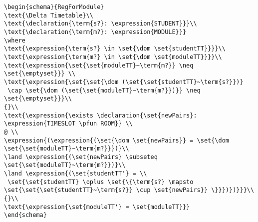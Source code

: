 \begin{verbatim}
\begin{schema}{RegForModule}
\text{\Delta Timetable}\\
\text{\declaration{\term{s?}: \expression{STUDENT}}}\\
\text{\declaration{\term{m?}: \expression{MODULE}}}
\where
\text{\expression{\term{s?} \in \set{\dom \set{studentTT}}}}\\
\text{\expression{\term{m?} \in \set{\dom \set{moduleTT}}}}\\
\text{\expression{\set{\set{moduleTT}~\term{m?}} \neq \set{\emptyset}}} \\
\text{\expression{\set{\set{\dom (\set{\set{studentTT}~\term{s?}})}
 \cap \set{\dom (\set{\set{moduleTT}~\term{m?}})}} \neq \set{\emptyset}}}\\
{}\\
\text{\expression{\exists \declaration{\set{newPairs}: \expression{TIMESLOT \pfun ROOM}} \\
@ \\
\expression{(\expression{(\set{\dom \set{newPairs}} = \set{\dom \set{\set{moduleTT}~\term{m?}}})}\\
\land \expression{(\set{newPairs} \subseteq \set{\set{moduleTT}~\term{m?}})}\\
\land \expression{(\set{studentTT'} = \\
 \set{\set{studentTT} \oplus \set{\{\term{s?} \mapsto \set{\set{\set{studentTT}~\term{s?}} \cup \set{newPairs}} \}}})})}}}\\
{}\\
\text{\expression{\set{moduleTT'} = \set{moduleTT}}}
\end{schema}

\end{verbatim}